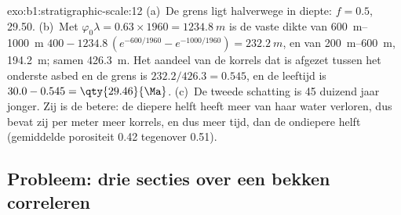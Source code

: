 \begin{solution}{exo:b1:stratigraphic-scale:12}
(a)~De grens ligt halverwege in diepte: $f = 0.5$, \qty{29.50}{\Ma}. (b)~Met
$\varphi_0\lambda = 0.63 \times 1960 = \qty{1234.8}{m}$ is de vaste dikte van
\qtyrange{600}{1000}{m} $400 - 1234.8\,(e^{-600/1960} - e^{-1000/1960}) =
\qty{232.2}{m}$, en van \qtyrange{200}{600}{m}, \qty{194.2}{m}; samen
\qty{426.3}{m}. Het aandeel van de korrels dat is afgezet tussen het onderste asbed en de grens is
$232.2/426.3 = 0.545$, en de leeftijd is $30.0 - 0.545 =
\qty{29.46}{\Ma}$. (c)~De tweede schatting is \num{45} duizend jaar jonger.
Zij is de betere: de diepere helft heeft meer van haar water verloren, dus bevat
zij per meter meer korrels, en dus meer tijd, dan de ondiepere helft (gemiddelde
porositeit \num{0.42} tegenover \num{0.51}).
\end{solution}

\subsection*{Probleem: drie secties over een bekken correleren}


